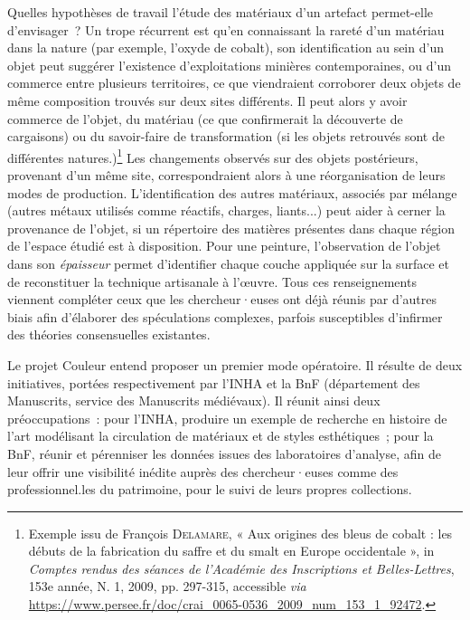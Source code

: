 \documentclass[a4paper,12pt, twoside]{book}
\begin{document}
Quelles hypothèses de travail l’étude des matériaux d’un artefact permet-elle d’envisager~?  Un trope récurrent est qu’en connaissant la rareté d’un matériau dans la nature (par exemple, l’oxyde de cobalt), son identification au sein d’un objet peut suggérer l’existence d’exploitations minières contemporaines, ou d’un commerce entre plusieurs territoires, ce que viendraient corroborer deux objets de même composition trouvés sur deux sites différents. Il peut alors y avoir commerce de l’objet, du matériau (ce que confirmerait la découverte de cargaisons) ou du savoir-faire de transformation (si les objets retrouvés sont de différentes natures.)\footnote{Exemple issu de François \textsc{Delamare}, « Aux origines des bleus de cobalt : les débuts de la fabrication du saffre et du smalt en Europe occidentale », in \textit{Comptes rendus des séances de l'Académie des Inscriptions et Belles-Lettres}, 153e année, N. 1, 2009, pp. 297-315, accessible \textit{via} \url{https://www.persee.fr/doc/crai_0065-0536_2009_num_153_1_92472}.} Les changements observés sur des objets postérieurs, provenant d’un même site, correspondraient alors à une réorganisation de leurs modes de production. L’identification des autres matériaux, associés par mélange (autres métaux utilisés comme réactifs, charges, liants...) peut aider à cerner la provenance de l’objet, si un répertoire des matières présentes dans chaque région de l’espace étudié est à disposition. Pour une peinture, l’observation de l’objet dans son \textit{épaisseur} permet d’identifier chaque couche appliquée sur la surface et de reconstituer la technique artisanale à l’œuvre. Tous ces renseignements viennent compléter ceux que les chercheur·euses ont déjà réunis par d’autres biais afin d’élaborer des spéculations complexes, parfois susceptibles d’infirmer des théories consensuelles existantes.

Le projet Couleur entend proposer un premier mode opératoire. Il résulte de deux initiatives, portées respectivement par l’INHA et la BnF (département des Manuscrits, service des Manuscrits médiévaux). Il réunit ainsi deux préoccupations~: pour l’INHA, produire un exemple de recherche en histoire de l’art modélisant la circulation de matériaux et de styles esthétiques~; pour la BnF, réunir et pérenniser les données issues des laboratoires d’analyse, afin de leur offrir une visibilité inédite auprès des chercheur·euses comme des professionnel.les du patrimoine, pour le suivi de leurs propres collections.
\end{document}
